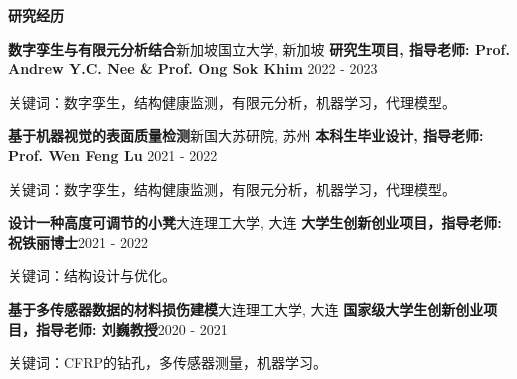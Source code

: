 \documentclass{resume} %
\begin{document}
\vspace{-1em}




\begin{rSection}{\bf {\fangsong 研究经历}}
\begin{rSubsection}{\bf {\fangsong 数字孪生与有限元分析结合}}{\fangsong 新加坡国立大学, 新加坡}
{\bf {\fangsong 研究生项目, 指导老师: Prof. Andrew Y.C. Nee \& Prof. Ong Sok Khim}  }{2022 - 2023}
	\item{\fangsong 关键词：数字孪生，结构健康监测，有限元分析，机器学习，代理模型。}\\
\end{rSubsection}

\begin{rSubsection}{\bf {\fangsong 基于机器视觉的表面质量检测}}{{\fangsong 新国大苏研院, 苏州}}
{\bf {\fangsong 本科生毕业设计, 指导老师: Prof. Wen Feng Lu}  }{2021 - 2022}
	\item{\fangsong 关键词：数字孪生，结构健康监测，有限元分析，机器学习，代理模型。}\\
\end{rSubsection}

\begin{rSubsection}{\bf {\fangsong 设计一种高度可调节的小凳}}{\fangsong 大连理工大学, 大连}
{\bf \fangsong 大学生创新创业项目，指导老师: 祝铁丽博士}{2021 - 2022}
	\item{\fangsong 关键词：结构设计与优化。}\\
\end{rSubsection}

\begin{rSubsection}{\bf \fangsong 基于多传感器数据的材料损伤建模}{\fangsong 大连理工大学, 大连}
{\bf \fangsong 国家级大学生创新创业项目，指导老师: 刘巍教授}{2020 - 2021}
	\item{\fangsong 关键词：CFRP的钻孔，多传感器测量，机器学习。}\\
\end{rSubsection}

\end{rSection}
\end{document}
